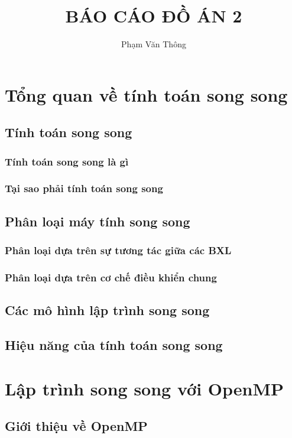 \documentclass{report}
\begin{document}
\title{BÁO CÁO ĐỒ ÁN 2}
\author{Phạm Văn Thông}

\maketitle
\chapter{Tổng quan về tính toán song song}
\section{Tính toán song song}
\subsection{Tính toán song song là gì}
\subsection{Tại sao phải tính toán song song}
\section{Phân loại máy tính song song}
\subsection{Phân loại dựa trên sự tương tác giữa các BXL}
\subsection{Phân loại dựa trên cơ chế điều khiển chung}
\section{Các mô hình lập trình song song}
\section{Hiệu năng của tính toán song song}
\chapter{Lập trình song song với OpenMP}
\section{Giới thiệu về OpenMP}
\end{document}
